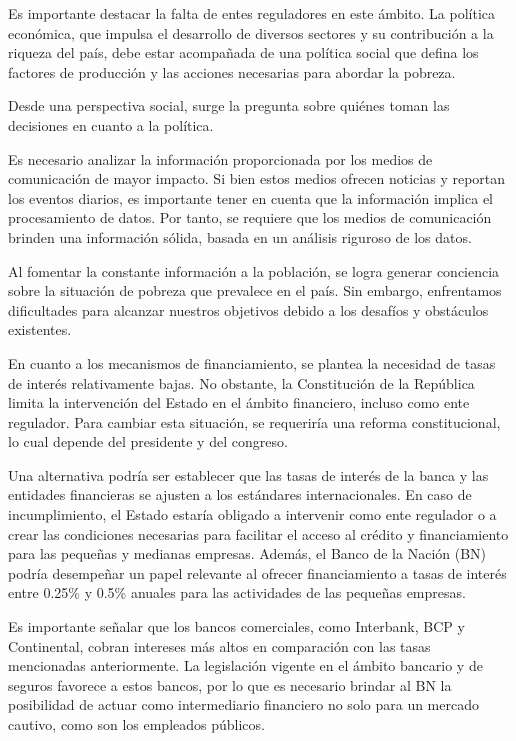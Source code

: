 \documentclass[
  jou,
  floatsintext,
  longtable,
  a4paper,
  nolmodern,
  notxfonts,
  notimes,
  12pt,
  colorlinks=true,linkcolor=blue,citecolor=blue,urlcolor=blue]{apa7}
\begin{document}
Es importante destacar la falta de entes reguladores en este ámbito. La
política económica, que impulsa el desarrollo de diversos sectores y su
contribución a la riqueza del país, debe estar acompañada de una
política social que defina los factores de producción y las acciones
necesarias para abordar la pobreza.

Desde una perspectiva social, surge la pregunta sobre quiénes toman las
decisiones en cuanto a la política.

Es necesario analizar la información proporcionada por los medios de
comunicación de mayor impacto. Si bien estos medios ofrecen noticias y
reportan los eventos diarios, es importante tener en cuenta que la
información implica el procesamiento de datos. Por tanto, se requiere
que los medios de comunicación brinden una información sólida, basada en
un análisis riguroso de los datos.

Al fomentar la constante información a la población, se logra generar
conciencia sobre la situación de pobreza que prevalece en el país. Sin
embargo, enfrentamos dificultades para alcanzar nuestros objetivos
debido a los desafíos y obstáculos existentes.

En cuanto a los mecanismos de financiamiento, se plantea la necesidad de
tasas de interés relativamente bajas. No obstante, la Constitución de la
República limita la intervención del Estado en el ámbito financiero,
incluso como ente regulador. Para cambiar esta situación, se requeriría
una reforma constitucional, lo cual depende del presidente y del
congreso.

Una alternativa podría ser establecer que las tasas de interés de la
banca y las entidades financieras se ajusten a los estándares
internacionales. En caso de incumplimiento, el Estado estaría obligado a
intervenir como ente regulador o a crear las condiciones necesarias para
facilitar el acceso al crédito y financiamiento para las pequeñas y
medianas empresas. Además, el Banco de la Nación (BN) podría desempeñar
un papel relevante al ofrecer financiamiento a tasas de interés entre
0.25\% y 0.5\% anuales para las actividades de las pequeñas empresas.

Es importante señalar que los bancos comerciales, como Interbank, BCP y
Continental, cobran intereses más altos en comparación con las tasas
mencionadas anteriormente. La legislación vigente en el ámbito bancario
y de seguros favorece a estos bancos, por lo que es necesario brindar al
BN la posibilidad de actuar como intermediario financiero no solo para
un mercado cautivo, como son los empleados públicos.
\end{document}
